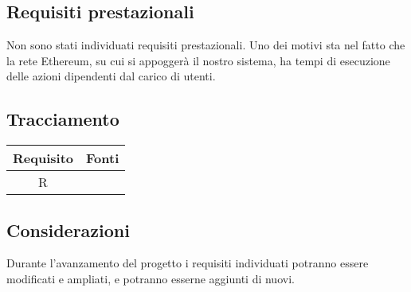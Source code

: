 \subsection{Requisiti prestazionali}
Non sono stati individuati requisiti prestazionali. Uno dei motivi sta nel fatto che la rete Ethereum, su cui si appoggerà il nostro sistema, ha tempi di esecuzione delle azioni dipendenti dal carico di utenti.
%		
%		

\subsection{Tracciamento}
\begin{center}
	\begin{longtable}{|c|c|}
		\hline
		\rowcolor{lighter-grayer}
		\textbf{Requisito} &  \textbf{Fonti}  \\
		\hline
		\endfirsthead
		
		 R & \\
		\hline
		
	\end{longtable}
\end{center}
\subsection{Considerazioni}
Durante l'avanzamento del progetto i requisiti individuati potranno essere modificati e ampliati, e potranno esserne aggiunti di nuovi.